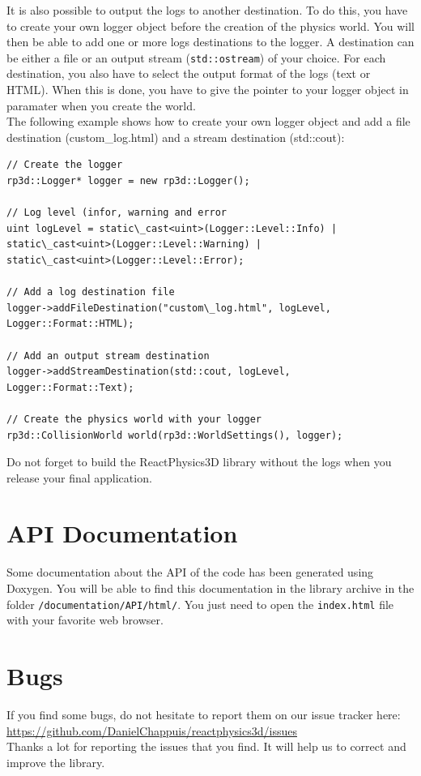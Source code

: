 \documentclass[a4paper,12pt]{article}
\begin{document}
    It is also possible to output the logs to another destination. To do this,
    you have to create your own logger object before the creation of the physics world. You will then be able to add one or more logs destinations
    to the logger. A destination can be either a file or an output stream (\texttt{std::ostream}) of your choice. For each destination, you also
    have to select the output format of the logs (text or HTML). When this is done, you have to give the pointer to your logger object in paramater
    when you create the world. \\

    The following example shows how to create your own logger object and add a file destination (custom\_log.html) and a stream destination (std::cout): \\

    \begin{lstlisting}
// Create the logger
rp3d::Logger* logger = new rp3d::Logger();

// Log level (infor, warning and error
uint logLevel = static\_cast<uint>(Logger::Level::Info) | static\_cast<uint>(Logger::Level::Warning) |
static\_cast<uint>(Logger::Level::Error);

// Add a log destination file
logger->addFileDestination("custom\_log.html", logLevel, Logger::Format::HTML);

// Add an output stream destination 
logger->addStreamDestination(std::cout, logLevel, Logger::Format::Text);

// Create the physics world with your logger
rp3d::CollisionWorld world(rp3d::WorldSettings(), logger);
    \end{lstlisting}

   \vspace{0.6cm}

   Do not forget to build the ReactPhysics3D library without the logs when you release your final application.

   \section{API Documentation}

   Some documentation about the API of the code has been generated
   using Doxygen. You will be able to find this documentation in the library archive in the folder \texttt{/documentation/API/html/}. You just
   need to open the \texttt{index.html} file with your favorite web browser.


   \section{Bugs}

   If you find some bugs, do not hesitate to report them on our issue tracker here: \\

   \url{https://github.com/DanielChappuis/reactphysics3d/issues} \\

   Thanks a lot for reporting the issues that you find. It will help us to correct and improve the library.
\end{document}
